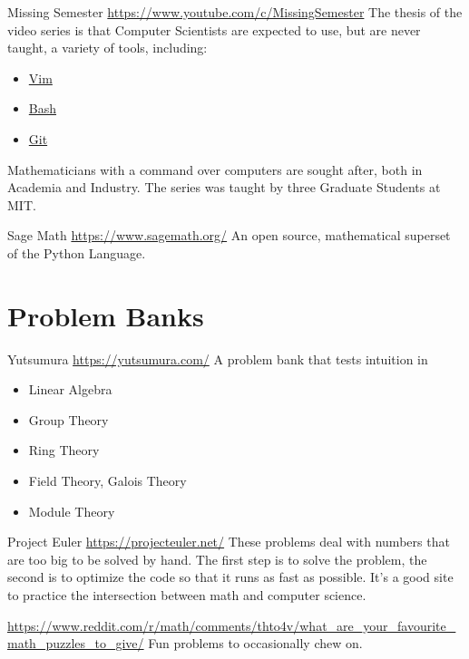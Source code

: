 %
\begin{boxResource}{Missing Semester}
\url{https://www.youtube.com/c/MissingSemester}
\tcblower
The thesis of the video series is that Computer Scientists are expected to use,
    but are never taught,
    a variety of tools,
    including:
\begin{itemize}
    \item \href{https://www.youtube.com/watch?v=a6Q8Na575qc}{Vim}
    \item \href{https://www.youtube.com/watch?v=Z56Jmr9Z34Q}{Bash}
    \item \href{https://www.youtube.com/watch?v=2sjqTHE0zok}{Git}
\end{itemize}
Mathematicians with a command over computers are sought after, both in Academia and Industry.
The series was taught by three Graduate Students at MIT.
\end{boxResource}
%
\begin{boxResource}{Sage Math}
\url{https://www.sagemath.org/}
\tcblower
An open source, mathematical superset of the Python Language.
\end{boxResource}
%
\section{Problem Banks}
\begin{boxResource}{Yutsumura}
\url{https://yutsumura.com/}
\tcblower
A problem bank that tests intuition in 
\begin{itemize}
    \item Linear Algebra
    \item Group Theory
    \item Ring Theory
    \item Field Theory, Galois Theory
    \item Module Theory
\end{itemize}

\end{boxResource}
%
\begin{boxResource}{Project Euler}
\url{https://projecteuler.net/}
\tcblower
These problems deal with numbers that are too big to be solved by hand.
The first step is to solve the problem,
    the second is to optimize the code so that it runs as fast as possible.
It's a good site to practice the intersection between math and computer science.
\end{boxResource}
\begin{boxResource}{}
\url{https://www.reddit.com/r/math/comments/thto4v/what_are_your_favourite_math_puzzles_to_give/}
\tcblower
Fun problems to occasionally chew on.
\end{boxResource}

